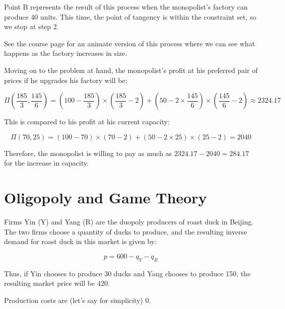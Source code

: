 \documentclass{article}
\newenvironment{solution}{\color{red}}{\color{black}}
\begin{document}
\begin{solution}
\begin{enumerate}
Point B represents the result of this process when the monopolist's factory can produce 40 units. This time, the point of tangency is within the constraint set, so we stop at step 2. 

See the course page for an animate version of this process where we can see what happens as the factory increases in size.

Moving on to the problem at hand, the monopolist's profit at his preferred pair of prices if he upgrades his factory will be:

\[ \Pi(\frac{185}3, \frac{145}6) = (100-\frac{185}3)\times(\frac{185}3-2)+(50-2\times\frac{145}6)\times(\frac{145}6-2) \approx 2324.17 \]

This is compared to his profit at his current capacity:

\[ \Pi(70, 25) = (100-70)\times(70-2)+(50-2\times 25)\times(25-2)=2040 \]

Therefore, the monopolist is willing to pay as much as $2324.17-2040=284.17$ for the increase in capacity.
\end{enumerate}

\end{solution}

\section*{Oligopoly and Game Theory}

Firms Yin (Y) and Yang (R) are the duopoly producers of roast duck in Beijing. The two firms choose a quantity of ducks to produce, and the resulting inverse demand for roast duck in this market is given by:

\[ p = 600 - q_Y - q_R \]

Thus, if Yin chooses to produce 30 ducks and Yang chooses to produce 150, the resulting market price will be 420.

Production costs are (let's say for simplicity) 0.
\end{document}
